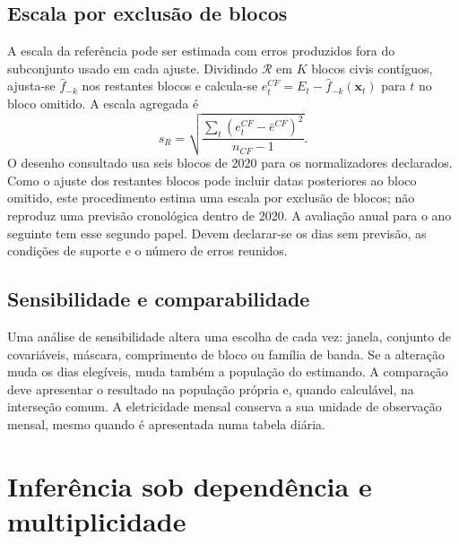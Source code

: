 \subsection{Escala por exclusão de blocos}
\label{sec:mat-crossfit}
A escala da referência pode ser estimada com erros produzidos fora do subconjunto usado em cada ajuste. Dividindo $\mathcal R$ em $K$ blocos civis contíguos, ajusta-se $\widehat f_{-k}$ nos restantes blocos e calcula-se $e_t^{CF}=E_t-\widehat f_{-k}(\boldsymbol x_t)$ para $t$ no bloco omitido. A escala agregada é
\begin{equation}
s_R=\sqrt{\frac{\sum_t(e_t^{CF}-\bar e^{CF})^2}{n_{CF}-1}}.
\label{eq:mat-crossfit}
\end{equation}
O desenho consultado usa seis blocos de 2020 para os normalizadores declarados. Como o ajuste dos restantes blocos pode incluir datas posteriores ao bloco omitido, este procedimento estima uma escala por exclusão de blocos; não reproduz uma previsão cronológica dentro de 2020. A avaliação anual para o ano seguinte tem esse segundo papel. Devem declarar-se os dias sem previsão, as condições de suporte e o número de erros reunidos.

\subsection{Sensibilidade e comparabilidade}
\label{sec:mat-sensibilidade}
Uma análise de sensibilidade altera uma escolha de cada vez: janela, conjunto de covariáveis, máscara, comprimento de bloco ou família de banda. Se a alteração muda os dias elegíveis, muda também a população do estimando. A comparação deve apresentar o resultado na população própria e, quando calculável, na interseção comum. A eletricidade mensal conserva a sua unidade de observação mensal, mesmo quando é apresentada numa tabela diária.


\section{Inferência sob dependência e multiplicidade}
\label{sec:mat-inferencia}

